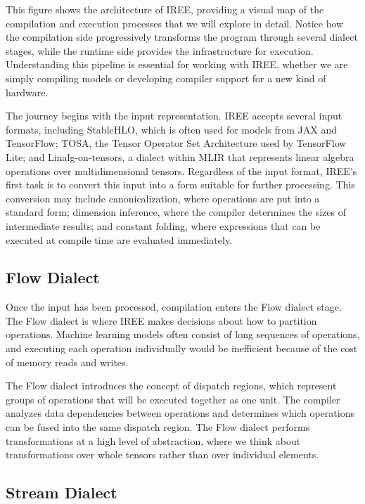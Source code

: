 \documentclass[11pt,a4paper]{article}
\begin{document}
This figure shows the architecture of IREE, providing a visual map of the compilation and execution processes that we will explore in detail. Notice how the compilation side progressively transforms the program through several dialect stages, while the runtime side provides the infrastructure for execution. Understanding this pipeline is essential for working with IREE, whether we are simply compiling models or developing compiler support for a new kind of hardware.

The journey begins with the input representation. IREE accepts several input formats, including StableHLO, which is often used for models from JAX and TensorFlow; TOSA, the Tensor Operator Set Architecture used by TensorFlow Lite; and Linalg-on-tensors, a dialect within MLIR that represents linear algebra operations over multidimensional tensors. Regardless of the input format, IREE's first task is to convert this input into a form suitable for further processing. This conversion may include canonicalization, where operations are put into a standard form; dimension inference, where the compiler determines the sizes of intermediate results; and constant folding, where expressions that can be executed at compile time are evaluated immediately.

\subsection{Flow Dialect}

Once the input has been processed, compilation enters the Flow dialect stage. The Flow dialect is where IREE makes decisions about how to partition operations. Machine learning models often consist of long sequences of operations, and executing each operation individually would be inefficient because of the cost of memory reads and writes.

The Flow dialect introduces the concept of dispatch regions, which represent groups of operations that will be executed together as one unit. The compiler analyzes data dependencies between operations and determines which operations can be fused into the same dispatch region. The Flow dialect performs transformations at a high level of abstraction, where we think about transformations over whole tensors rather than over individual elements.

\subsection{Stream Dialect}
\end{document}
